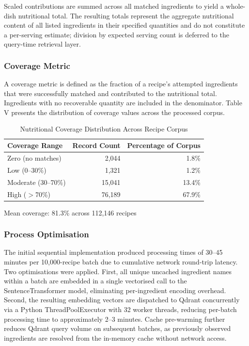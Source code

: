 \documentclass[conference]{IEEEtran}
\begin{document}
Scaled contributions are summed across all matched ingredients to yield a whole-dish nutritional total. The resulting totals represent the aggregate nutritional content of all listed ingredients in their specified quantities and do not constitute a per-serving estimate; division by expected serving count is deferred to the query-time retrieval layer.

\subsubsection{Coverage Metric}
 A coverage metric is defined as the fraction of a recipe's attempted ingredients that were successfully matched and contributed to the nutritional total. Ingredients with no recoverable quantity are included in the denominator. Table V presents the distribution of coverage values across the processed corpus.

\begin{table}[H]
\caption{Nutritional Coverage Distribution Across Recipe Corpus}
\label{tab:nutrition_coverage}
\centering
\footnotesize
\begin{tabular}{l r r}
\toprule
\textbf{Coverage Range} & \textbf{Record Count} & \textbf{Percentage of Corpus} \\
\midrule

Zero (no matches) & 2,044  & 1.8\% \\
Low (0--30\%)     & 1,321  & 1.2\% \\
Moderate (30--70\%) & 15,041 & 13.4\% \\
High ($>$70\%)     & 76,189 & 67.9\% \\

\bottomrule
\end{tabular}

\vspace{2mm}
\footnotesize Mean coverage: 81.3\% across 112,146 recipes
\end{table}

\subsubsection{Process Optimisation}
The initial sequential implementation produced processing times of 30–45 minutes per 10,000-recipe batch due to cumulative network round-trip latency. Two optimisations were applied. First, all unique uncached ingredient names within a batch are embedded in a single vectorised call to the SentenceTransformer model, eliminating per-ingredient encoding overhead. Second, the resulting embedding vectors are dispatched to Qdrant concurrently via a Python ThreadPoolExecutor with 32 worker threads, reducing per-batch processing time to approximately 2–3 minutes. Cache pre-warming further reduces Qdrant query volume on subsequent batches, as previously observed ingredients are resolved from the in-memory cache without network access.
\end{document}
